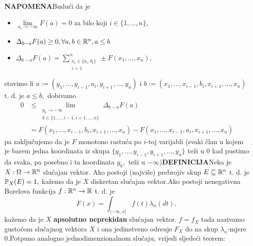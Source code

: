 \documentclass{article}
\begin{document}
\textbf{NAPOMENA}\newline Budući da je
\begin{itemize}
    \item[\ding{228}] \(\lim\limits_{a_i\to-\infty} F(a)=0\) za bilo koji \(i\in\{1,\ldots,n\},\)
    \item[\ding{228}] \(\Delta_{b-a}F(a)\ge0,\forall a,b\in\Bbb R^n,a\le b\)
    \item[\ding{228}] \(\displaystyle\Delta_{b-a}F(a)=\sum_{\substack{x_i\in\{a_i,b_i\}\\i=1}}^n\pm F(x_1,\ldots,x_n),\)
\end{itemize} stavimo li \(a:=(y_1,\ldots,y_{i-1},a_i,y_{i+1},\ldots,y_n)\) i \(b:=(x_1,\ldots,x_{i-1},b_i,x_{i+1},\ldots,x_n)\) t. d. je \(a\le b,\) dobivamo \[\begin{aligned}0&\le\lim_{\substack{y_k\to-\infty\\k\in\{1,\ldots,i-1,i+1,\ldots,n\}}}\Delta_{b-a}F(a)\\&=F(x_1,\ldots,x_{i-1},b_i,x_{i+1},\ldots,x_n)-F(x_1,\ldots,x_{i-1},a_i,x_{i+1},\ldots,x_n)\end{aligned}\] pa zaključujemo da je \(F\) monotono rastuća po \(i\)-toj varijabli (svaki član u kojem je barem jedna koordinata iz skupa \(\{y_1,\ldots,y_{i-1},y_{i+1},\ldots,y_n\}\) teži u \(0\) kad pustimo da svaka, pa posebno i ta koordinata \(y_k,\) teži u \(-\infty\))\newline\newline\textbf{DEFINICIJA}\newline Neka je \(X:\Omega\to\Bbb R^n\) slučajan vektor. Ako postoji (najviše) prebrojiv skup \(E\subseteq\Bbb R^n\) t. d. je \(\Bbb P_X(E)=1,\) kažemo da je \(X\) diskretan slučajan vektor.\newline\newline Ako postoji nenegativna Borelova funkcija \(f:\Bbb R^n\to\Bbb R\) t. d. je \[F(x)=\int_{\langle-\infty,x]}f(t)\lambda_n(dt),\] kažemo da je \(X\) \textbf{apsolutno neprekidan} slučajan vektor. \(f=f_X\) tada nazivamo gustoćom slučajnog vektora \(X\) i ona jedinstveno odre\dj{}uje \(F_X\) do na skup \(\lambda_n\)-mjere \(0.\)\newline\newline Potpuno analogno jednodimenzionalnom slučaju, vrijedi sljedeći teorem:\newline
\end{document}

